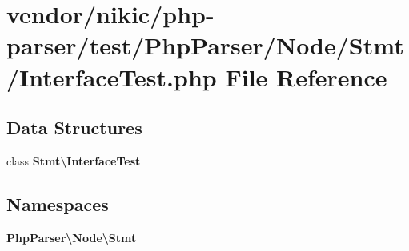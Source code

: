 \section{vendor/nikic/php-\/parser/test/\+Php\+Parser/\+Node/\+Stmt/\+Interface\+Test.php File Reference}
\label{nikic_2php-parser_2test_2_php_parser_2_node_2_stmt_2_interface_test_8php}
\subsection*{Data Structures}
\begin{DoxyCompactItemize}
\item 
class {\bf Stmt\textbackslash{}\+Interface\+Test}
\end{DoxyCompactItemize}
\subsection*{Namespaces}
\begin{DoxyCompactItemize}
\item 
 {\bf Php\+Parser\textbackslash{}\+Node\textbackslash{}\+Stmt}
\end{DoxyCompactItemize}
